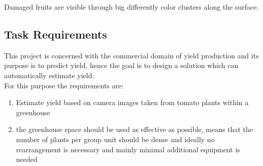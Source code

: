 Damaged fruits are visible through big differently color clusters along the surface.

\clearpage
\subsection{Task Requirements}\label{subsec:task-requirements}

This project is concerned with the commercial domain of yield production and its purpose
is to predict yield, hence the goal is to design a solution which can automatically estimate yield:\\

For this purpose the requirements are:

\begin{enumerate}
    \item Estimate yield based on camera images taken from tomato plants within a greenhouse
    \item the greenhouse space should be used as effective as possible, means that the number of plants per group unit should be dense
    and ideally no rearrangement is necessary and mainly minimal additional equipment is needed
\end{enumerate}
\newpage
